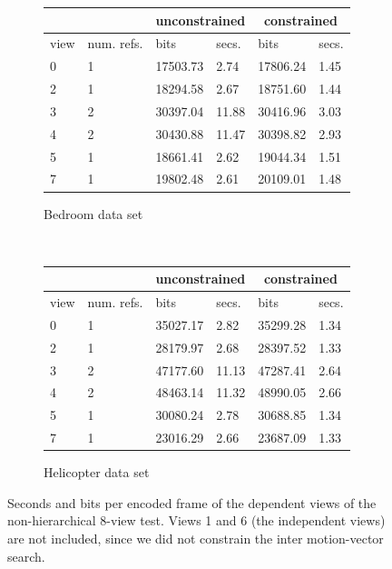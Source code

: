 \documentclass{sig-alternate-05-2015}
\begin{document}
\begin{figure}[h]
\centering\small
\begin{subfigure}{.4\textwidth}
\centering
\begin{tabular}{|l|l|l|l|l|l|}
\multicolumn{2}{c}{} & \multicolumn{2}{c}{unconstrained} & \multicolumn{2}{c}{constrained} \\ \hline
view & num. refs.    & bits            & secs.           & bits            & secs.         \\ \hline
0    & 1             & 17503.73        & 2.74            & 17806.24        & 1.45          \\ \hline
2    & 1             & 18294.58        & 2.67            & 18751.60        & 1.44          \\ \hline
3    & 2             & 30397.04        & 11.88           & 30416.96        & 3.03          \\ \hline
4    & 2             & 30430.88        & 11.47           & 30398.82        & 2.93          \\ \hline
5    & 1             & 18661.41        & 2.62            & 19044.34        & 1.51          \\ \hline
7    & 1             & 19802.48        & 2.61            & 20109.01        & 1.48          \\ \hline
\end{tabular}
\caption{Bedroom data set}
\label{fig:bedroom-time-constrained}
\end{subfigure} \\
\begin{subfigure}{.4\textwidth}
\centering
\begin{tabular}{|l|l|l|l|l|l|}
\multicolumn{2}{c}{} & \multicolumn{2}{c}{unconstrained} & \multicolumn{2}{c}{constrained} \\ \hline
view & num. refs.    & bits            & secs.           & bits            & secs.         \\ \hline
0    & 1             & 35027.17        & 2.82            & 35299.28        & 1.34          \\ \hline
2    & 1             & 28179.97        & 2.68            & 28397.52        & 1.33          \\ \hline
3    & 2             & 47177.60        & 11.13           & 47287.41        & 2.64          \\ \hline
4    & 2             & 48463.14        & 11.32           & 48990.05        & 2.66          \\ \hline
5    & 1             & 30080.24        & 2.78            & 30688.85        & 1.34          \\ \hline
7    & 1             & 23016.29        & 2.66            & 23687.09        & 1.33          \\ \hline
\end{tabular}
\caption{Helicopter data set}
\label{fig:helicopter-time-constrained}
\end{subfigure}
\caption{Seconds and bits per encoded frame of the dependent views of the
non-hierarchical 8-view test. Views 1 and 6 (the independent views) are not
included, since we did not constrain the inter motion-vector search.}
\label{fig:time-constrained}
\end{figure}
\end{document}
